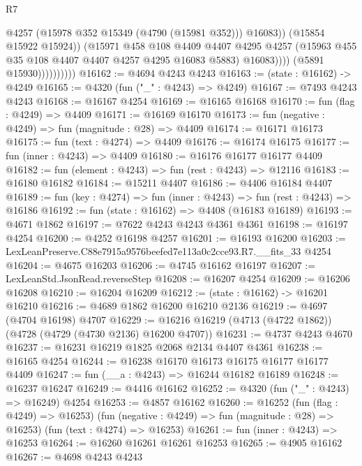 \begin{lexlean}{R7}
\begin{coremodule}
                                  @4257
                                  (@15978 @352 @15349 (@4790 (@15981 @352)))
                                  @16083))
                              (@15854 @15922 @15924))
                            (@15971
                              @458
                              @108
                              @4409
                              @4407
                              @4295
                              @4257
                              (@15963 @455 @35 @108 @4407 @4407 @4257 @4295 @16083 @5883)
                              @16083))))
                      (@5891 @15930))))))))))
@16162 := @4694 @4243 @4243
@16163 := (state : @16162) -> @4249
@16165 := @4320 (fun ("_" : @4243) => @4249)
@16167 := @7493 @4243 @4243
@16168 := @16167 @4254
@16169 := @16165 @16168
@16170 := fun (flag : @4249) => @4409
@16171 := @16169 @16170
@16173 := fun (negative : @4249) => fun (magnitude : @28) => @4409
@16174 := @16171 @16173
@16175 := fun (text : @4274) => @4409
@16176 := @16174 @16175
@16177 := fun (inner : @4243) => @4409
@16180 := @16176 @16177 @16177 @4409
@16182 := fun (element : @4243) => fun (rest : @4243) => @12116
@16183 := @16180 @16182
@16184 := @15211 @4407
@16186 := @4406 @16184 @4407
@16189 := fun (key : @4274) => fun (inner : @4243) => fun (rest : @4243) => @16186
@16192 := fun (state : @16162) => @4408 (@16183 @16189)
@16193 := @4671 @1862
@16197 := @7622 @4243 @4243 @4361 @4361
@16198 := @16197 @4254
@16200 := @4252 @16198 @4257
@16201 := @16193 @16200
@16203 := LexLeanPreserve.C88e7915a9576beefed7e113a0c2cce93.R7.__fits_33 @4254
@16204 := @4675 @16203
@16206 := @4745 @16162 @16197
@16207 := LexLeanStd.JsonRead.reverseStep
@16208 := @16207 @4254
@16209 := @16206 @16208
@16210 := @16204 @16209
@16212 := (state : @16162) -> @16201 @16210
@16216 := @4689 @1862 @16200 @16210 @2136
@16219 := @4697 (@4704 @16198) @4707
@16229 := @16216 @16219 (@4713 (@4722 @1862)) (@4728 (@4729 (@4730 @2136) @16200 @4707))
@16231 := @4737 @4243 @4670
@16237 := @16231 @16219 @1825 @2068 @2134 @4407 @4361
@16238 := @16165 @4254
@16244 := @16238 @16170 @16173 @16175 @16177 @16177 @4409
@16247 := fun (__a : @4243) => @16244 @16182 @16189
@16248 := @16237 @16247
@16249 := @4416 @16162
@16252 := @4320 (fun ("_" : @4243) => @16249) @4254
@16253 := @4857 @16162
@16260 := @16252
    (fun (flag : @4249) => @16253)
    (fun (negative : @4249) => fun (magnitude : @28) => @16253)
    (fun (text : @4274) => @16253)
@16261 := fun (inner : @4243) => @16253
@16264 := @16260 @16261 @16261 @16253
@16265 := @4905 @16162
@16267 := @4698 @4243 @4243

\end{coremodule}
\end{lexlean}
